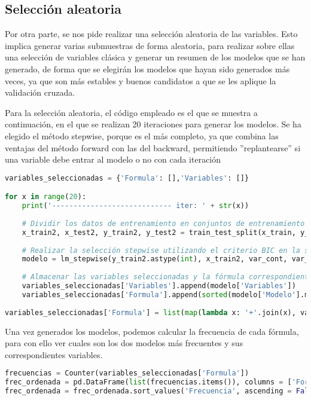 \documentclass[a4paper,onecolumn]{extarticle}
\begin{document}
\begin{sloppypar}
\subsection{Selección aleatoria}\label{linaleatoria}
Por otra parte, se nos pide realizar una selección aleatoria de las variables. Esto implica generar varias submuestras de forma aleatoria, para realizar 
sobre ellas una selección de variables clásica y generar un resumen de los modelos que se han generado, de forma que se elegirán los modelos que hayan sido 
generados más veces, ya que son más estables y buenos candidatos a que se les aplique la validación cruzada.

Para la selección aleatoria, el código empleado es el que se muestra a continuación, en el que se realizan 20 iteraciones para generar los modelos. Se ha 
elegido el método stepwise, porque es el más completo, ya que combina las ventajas del método forward con las del backward, permitiendo ''replantearse'' si 
una variable debe entrar al modelo o no con cada iteración
\begin{lstlisting}[language=Python]
variables_seleccionadas = {'Formula': [],'Variables': []}

for x in range(20):
    print('---------------------------- iter: ' + str(x))
    
    # Dividir los datos de entrenamiento en conjuntos de entrenamiento y prueba.
    x_train2, x_test2, y_train2, y_test2 = train_test_split(x_train, y_train, test_size = 0.3, random_state = 29112002 + x)
    
    # Realizar la selección stepwise utilizando el criterio BIC en la submuestra.
    modelo = lm_stepwise(y_train2.astype(int), x_train2, var_cont, var_categ, interacciones_unicas, 'BIC')
    
    # Almacenar las variables seleccionadas y la fórmula correspondiente.
    variables_seleccionadas['Variables'].append(modelo['Variables'])
    variables_seleccionadas['Formula'].append(sorted(modelo['Modelo'].model.exog_names))
    
variables_seleccionadas['Formula'] = list(map(lambda x: '+'.join(x), variables_seleccionadas['Formula']))
\end{lstlisting}

Una vez generados los modelos, podemos calcular la frecuencia de cada fórmula, para con ello ver cuales son los dos modelos más frecuentes y sus 
correspondientes variables.

\begin{lstlisting}[language=Python]
frecuencias = Counter(variables_seleccionadas['Formula'])
frec_ordenada = pd.DataFrame(list(frecuencias.items()), columns = ['Formula', 'Frecuencia'])
frec_ordenada = frec_ordenada.sort_values('Frecuencia', ascending = False).reset_index()


\end{lstlisting}
\end{sloppypar}
\end{document}
